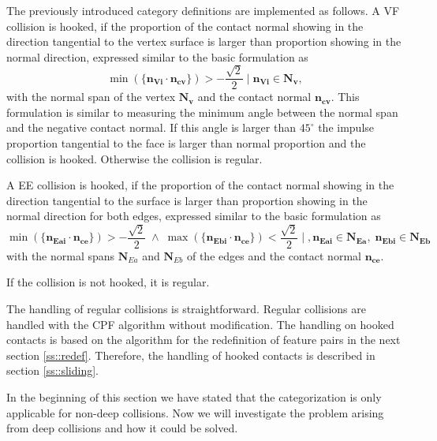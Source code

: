 The previously introduced category definitions are implemented as follows. 
A VF collision is hooked, if the proportion of the contact normal showing in the direction tangential to the vertex surface is larger than proportion showing in the normal direction, expressed similar to the basic formulation as
\begin{equation}
\min(\mathbf{\{n_{Vi} \cdot n_{cv}\}})>-\frac{\sqrt 2}{2} \; | \; \mathbf{n_{Vi}} \in \mathbf{N_{v}},
\end{equation} with the normal span of the vertex $\mathbf{N_{v}}$ and the contact normal $\mathbf{n_{cv}}$. This formulation is similar to measuring the minimum angle between the normal span and the negative contact normal. If this angle is larger than $45^\circ$ the impulse proportion tangential to the face is larger than normal proportion and the collision is hooked.
Otherwise the collision is regular.


A EE collision is hooked,  if the proportion of the contact normal showing in the direction tangential to the surface is larger than proportion showing in the normal direction for both edges, expressed similar to the basic formulation as
\begin{equation}
\min(\mathbf{\{{n}_{Eai}\cdot{n}_{ce}\}})>-\frac{\sqrt 2}{2} \; \land  \; \max(\mathbf{\{{n}_{Ebi}\cdot{n}_{ce}\}})<\frac{\sqrt 2}{2} \; | \;, \mathbf{n_{Eai}} \in \mathbf{N_{Ea}},\; \mathbf{n_{Ebi}} \in \mathbf{N_{Eb}}
\end{equation} with the normal spans $\mathbf{N}_{Ea}$ and $\mathbf{N}_{Eb}$ of the edges and the contact normal $\mathbf{n_{ce}}$.

If the collision is not hooked, it is regular.

The handling of regular collisions is straightforward. Regular collisions are handled with the CPF algorithm without modification. The handling on hooked contacts is based on the algorithm for the redefinition of feature pairs in the next section \ref{ss::redef}. Therefore, the handling of hooked contacts is described in section \ref{ss::sliding}.

In the beginning of this section we have stated that the categorization is only applicable for non-deep collisions. Now we will investigate the problem arising from deep collisions and how it could be solved.

